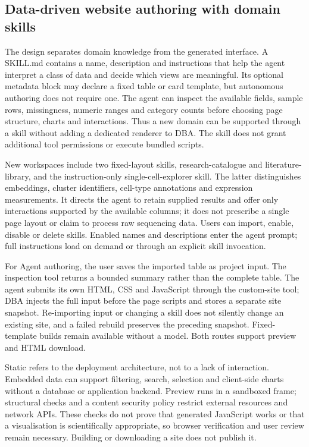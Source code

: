 \documentclass[11pt,a4paper]{article}
\begin{document}
\subsection{Data-driven website authoring with domain skills}\label{static-workflow}

The design separates domain knowledge from the generated interface. A
SKILL.md contains a name, description and instructions that help the
agent interpret a class of data and decide which views are meaningful.
Its optional metadata block may declare a fixed table or card template,
but autonomous authoring does not require one. The agent can inspect the
available fields, sample rows, missingness, numeric ranges and category
counts before choosing page structure, charts and interactions. Thus a
new domain can be supported through a skill without adding a dedicated
renderer to DBA. The skill does not grant additional tool permissions or
execute bundled scripts.

New workspaces include two fixed-layout skills, research-catalogue and
literature-library, and the instruction-only single-cell-explorer skill.
The latter distinguishes embeddings, cluster identifiers, cell-type
annotations and expression measurements. It directs the agent to retain
supplied results and offer only interactions supported by the available
columns; it does not prescribe a single page layout or claim to process
raw sequencing data. Users can import, enable, disable or delete skills.
Enabled names and descriptions enter the agent prompt; full instructions
load on demand or through an explicit skill invocation.

For Agent authoring, the user saves the imported table as project input.
The inspection tool returns a bounded summary rather than the complete
table. The agent submits its own HTML, CSS and JavaScript through the
custom-site tool; DBA injects the full input before the page scripts and
stores a separate site snapshot. Re-importing input or changing a skill
does not silently change an existing site, and a failed rebuild preserves
the preceding snapshot. Fixed-template builds remain available without
a model. Both routes support preview and HTML download.

Static refers to the deployment architecture, not to a lack of
interaction. Embedded data can support filtering, search, selection and
client-side charts without a database or application backend. Preview
runs in a sandboxed frame; structural checks and a content security policy
restrict external resources and network APIs. These checks do not prove
that generated JavaScript works or that a visualisation is scientifically
appropriate, so browser verification and user review remain necessary.
Building or downloading a site does not publish it.
\end{document}
